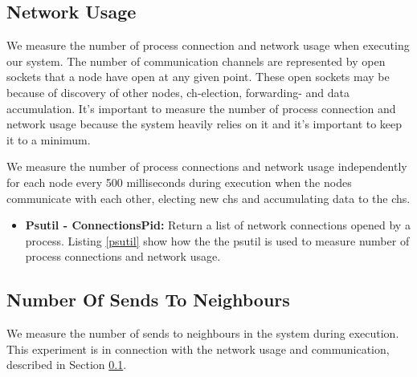 \documentclass[USenglish]{uit-thesis}
\begin{document}


\subsection{Network Usage} \label{eva:net_measure}
We measure the number of process connection and network usage when executing our system. The number of communication channels are represented by open sockets that a node have open at any given point. These open sockets may be because of discovery of other nodes, \gls{ch}-election, forwarding- and data accumulation. It's important to measure the number of process connection and network usage because the system heavily relies on it and it's important to keep it to a minimum.


We measure the number of process connections and network usage independently for each node every 500 milliseconds during execution when the nodes communicate with each other, electing new \glspl{ch} and accumulating data to the \glspl{ch}.

\begin{itemize}
\item \textbf{Psutil - ConnectionsPid:} Return a list of network connections opened by a process. Listing \ref{psutil} show how the the psutil is used to measure number of process connections and network usage.
\end{itemize}



\subsection{Number Of Sends To Neighbours} \label{eva:num_sends}
We measure the number of sends to neighbours in the system during execution. This experiment is in connection with the network usage and communication, described in Section \ref{eva:net_measure}. 
\end{document}
